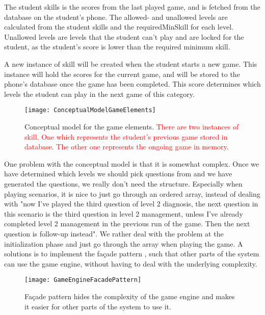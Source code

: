 The student skills is the scores from the last played game, and is fetched from the database on the student's phone. The allowed- and unallowed levels are calculated from the student skills and the requiredMinSkill for each level. Unallowed levels are levels that the student can't play and are locked for the student, as the student's score is lower than the required minimum skill.

A new instance of skill will be created when the student starts a new game. This instance will hold the scores for the current game, and will be stored to the phone's database once the game has been completed. This score determines which levels the student can play in the next game of this category.


\begin{figure}[h!]
	\caption {Conceptual model for the game elements. \textcolor{red}{There are two instances of skill. One which represents the student's previous game stored in database. The other one represents the ongoing game in memory.}}
	\label{fig:ConceptualGameElements}
	\texttt{[image: ConceptualModelGameElements]}
\end{figure}

One problem with the conceptual model is that it is somewhat complex. Once we have determined which levels we should pick questions from and we have generated the questions, we really don't need the structure. Especially when playing scenarios, it is nice to just go through an ordered array, instead of dealing with "now I've played the third question of level 2 diagnosis, the next question in this scenario is the third question in level 2 management, unless I've already completed level 2 management in the previous run of the game. Then the next question is follow-up instead". We rather deal with the problem at the initialization phase and just go through the array when playing the game. A solutions is to implement the façade pattern \parencite{Gamma1994}, such that other parts of the system can use the game engine, without having to deal with the underlying complexity. 


\begin{figure}[h!]
	\caption {Façade pattern hides the complexity of the game engine and makes it easier for other parts of the system to use it.}
	\label{fig:GameEngineFacadePattern}
	\texttt{[image: GameEngineFacadePattern]}
\end{figure}

